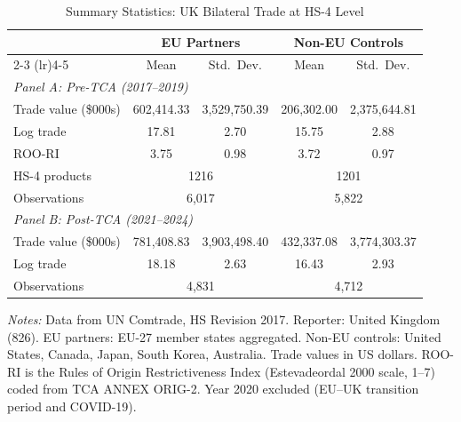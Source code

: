 \begin{table}[H]
\centering
\caption{Summary Statistics: UK Bilateral Trade at HS-4 Level}
\label{tab:summary}
\begin{threeparttable}
\begin{tabular}{lcccc}
\toprule
 & \multicolumn{2}{c}{EU Partners} & \multicolumn{2}{c}{Non-EU Controls} \\
\cmidrule(lr){2-3} \cmidrule(lr){4-5}
 & Mean & Std.\ Dev. & Mean & Std.\ Dev. \\
\midrule
\multicolumn{5}{l}{\textit{Panel A: Pre-TCA (2017--2019)}} \\[3pt]
Trade value (\$000s) & 602,414.33 & 3,529,750.39 & 206,302.00 & 2,375,644.81 \\
Log trade & 17.81 & 2.70 & 15.75 & 2.88 \\
ROO-RI & 3.75 & 0.98 & 3.72 & 0.97 \\
HS-4 products & \multicolumn{2}{c}{1216} & \multicolumn{2}{c}{1201} \\
Observations & \multicolumn{2}{c}{6,017} & \multicolumn{2}{c}{5,822} \\
\midrule
\multicolumn{5}{l}{\textit{Panel B: Post-TCA (2021--2024)}} \\[3pt]
Trade value (\$000s) & 781,408.83 & 3,903,498.40 & 432,337.08 & 3,774,303.37 \\
Log trade & 18.18 & 2.63 & 16.43 & 2.93 \\
Observations & \multicolumn{2}{c}{4,831} & \multicolumn{2}{c}{4,712} \\
\bottomrule
\end{tabular}
\begin{tablenotes}[flushleft]
\small
\item \textit{Notes:} Data from UN Comtrade, HS Revision 2017. Reporter: United Kingdom (826). EU partners: EU-27 member states aggregated. Non-EU controls: United States, Canada, Japan, South Korea, Australia. Trade values in US dollars. ROO-RI is the Rules of Origin Restrictiveness Index (Estevadeordal 2000 scale, 1--7) coded from TCA ANNEX ORIG-2. Year 2020 excluded (EU--UK transition period and COVID-19).
\end{tablenotes}
\end{threeparttable}
\end{table}
